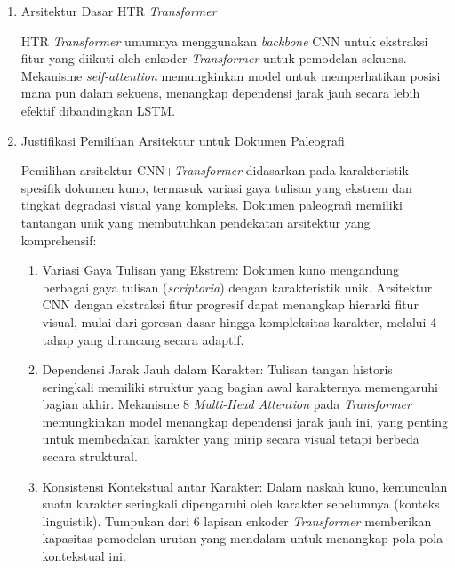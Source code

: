 \documentclass[12pt,a4paper]{article}
\begin{document}
\begin{enumerate}[leftmargin=*, labelindent=0pt, itemsep=1ex, topsep=0pt]

\item Arsitektur Dasar HTR \textit{Transformer}
\label{para:arsitektur-dasar-htr-transformer}

HTR \textit{Transformer} umumnya menggunakan \textit{backbone} CNN untuk ekstraksi fitur yang diikuti oleh enkoder \textit{Transformer} untuk pemodelan sekuens. Mekanisme \textit{self-attention} memungkinkan model untuk memperhatikan posisi mana pun dalam sekuens, menangkap dependensi jarak jauh secara lebih efektif dibandingkan LSTM.

\item Justifikasi Pemilihan Arsitektur untuk Dokumen Paleografi
\label{para:justifikasi-pemilihan-arsitektur}

Pemilihan arsitektur CNN+\textit{Transformer} didasarkan pada karakteristik spesifik dokumen kuno, termasuk variasi gaya tulisan yang ekstrem dan tingkat degradasi visual yang kompleks. Dokumen paleografi memiliki tantangan unik yang membutuhkan pendekatan arsitektur yang komprehensif:

\begin{enumerate}[leftmargin=1.5em, labelsep=0.5em, itemindent=0pt, label=\alph*., topsep=0pt, parsep=0pt, itemsep=0pt]
      \item Variasi Gaya Tulisan yang Ekstrem: Dokumen kuno mengandung berbagai gaya tulisan (\textit{scriptoria}) dengan karakteristik unik. Arsitektur CNN dengan ekstraksi fitur progresif dapat menangkap hierarki fitur visual, mulai dari goresan dasar hingga kompleksitas karakter, melalui 4 tahap yang dirancang secara adaptif.

      \item Dependensi Jarak Jauh dalam Karakter: Tulisan tangan historis seringkali memiliki struktur yang bagian awal karakternya memengaruhi bagian akhir. Mekanisme 8 \textit{Multi-Head Attention} pada \textit{Transformer} memungkinkan model menangkap dependensi jarak jauh ini, yang penting untuk membedakan karakter yang mirip secara visual tetapi berbeda secara struktural.

      \item Konsistensi Kontekstual antar Karakter: Dalam naskah kuno, kemunculan suatu karakter seringkali dipengaruhi oleh karakter sebelumnya (konteks linguistik). Tumpukan dari 6 lapisan enkoder \textit{Transformer} memberikan kapasitas pemodelan urutan yang mendalam untuk menangkap pola-pola kontekstual ini.


\end{enumerate}
\end{enumerate}
\end{document}

